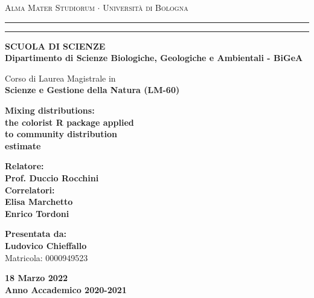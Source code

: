 \documentclass[12pt,a4paper]{article}
\begin{document}

\begin{titlepage}
\begin{center}
{{\Large{\textsc{Alma Mater Studiorum $\cdot$ Universit\`a di
Bologna}}}} \rule[0.1cm]{15.8cm}{0.1mm}
\rule[0.5cm]{15.8cm}{0.6mm}
{\small{\bf SCUOLA DI SCIENZE\\
Dipartimento di Scienze Biologiche, Geologiche e Ambientali - BiGeA }}
\end{center}
\vspace{6mm}
\begin{center}  
    {Corso di Laurea Magistrale in\\
    \bf Scienze e Gestione della Natura (LM-60)}
\end{center}
\vspace{15mm}
\begin{center}
{\LARGE{\bf Mixing distributions:}}\\  
\vspace{3mm}
{\LARGE{\bf the colorist R package applied }}\\
\vspace{3mm}
{\LARGE{\bf to community distribution}}\\
\vspace{3mm}
{\LARGE{\bf estimate}}\\
\end{center}
\vspace{30mm}
\par
\noindent
\begin{minipage}[t]{0.47\textwidth}
{\large{\bf Relatore:\\
Prof. Duccio Rocchini}}\\

{\large{\bf Correlatori:\\
Elisa Marchetto\\ Enrico Tordoni}}
\end{minipage}
\hfill
\begin{minipage}[t]{0.47\textwidth}\raggedleft
{\large{\bf Presentata da:
\\

Ludovico Chieffallo}\\
\vspace{3mm}
Matricola: 0000949523}
\end{minipage}
\vspace{20mm}
\begin{center}
{\large{\bf 18 Marzo 2022\\

Anno Accademico 2020-2021 }}
\end{center}
\end{titlepage}
\end{document}
